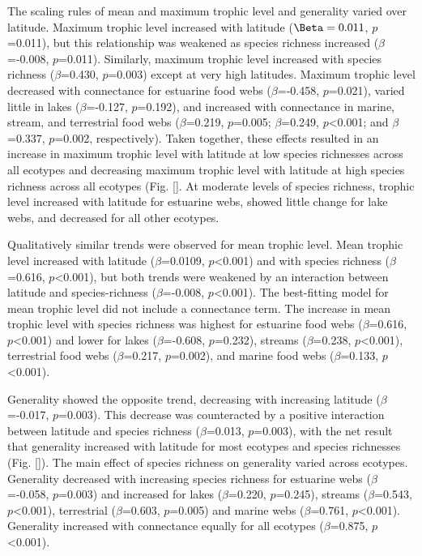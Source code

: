 The scaling rules of mean and maximum trophic level and generality varied over latitude. 
Maximum trophic level increased with 
latitude ($\Beta=0.011$, $p$=0.011), but this relationship was weakened as species richness increased ($\beta$=-0.008, $
p$=0.011). Similarly, maximum trophic level increased with species richness ($\beta$=0.430, $p$=0.003) except at very 
high latitudes. Maximum trophic level decreased with connectance for estuarine food webs ($\beta$=-0.458, $p$=0.021), 
varied little in lakes ($\beta$=-0.127, $p$=0.192), and increased with connectance in marine, stream, and terrestrial 
food webs ($\beta$=0.219, $p$=0.005; $\beta$=0.249, $p$<0.001; and $\beta$=0.337, $p$=0.002, respectively). Taken 
together, these effects resulted in an increase in maximum trophic level with latitude at low species richnesses across 
all ecotypes and decreasing maximum trophic level with latitude at high species richness across all ecotypes 
(Fig. \ref{}. At moderate levels of species richness, trophic level increased with latitude for estuarine webs, showed 
little change for lake webs, and decreased for all other ecotypes. 


Qualitatively similar trends were observed for mean trophic level. Mean trophic level increased with latitude 
($\beta$=0.0109, $p$<0.001) and with species richness ($\beta$=0.616, $p$<0.001), but both trends were weakened by an 
interaction between latitude and species-richness ($\beta$=-0.008, $p$<0.001). The best-fitting model for mean trophic 
level did not include a connectance term. The increase in mean trophic level with species richness was highest for 
estuarine food webs ($\beta$=0.616, $p$<0.001) and lower for lakes ($\beta$=-0.608, $p$=0.232), streams 
($\beta$=0.238, $p$<0.001), terrestrial food webs ($\beta$=0.217, $p$=0.002), and marine food webs 
($\beta$=0.133, $p$<0.001). 


Generality showed the opposite trend, decreasing with increasing latitude ($\beta$=-0.017, $p$=0.003). This decrease 
was counteracted by a positive interaction between latitude and species richness ($\beta$=0.013, $p$=0.003), with the net result that generality increased with latitude for most ecotypes and species richnesses (Fig. \ref{}).
The main effect of species richness on generality varied across ecotypes. Generality decreased with increasing species 
richness for estuarine webs ($\beta$=-0.058, $p$=0.003) and increased for lakes ($\beta$=0.220, $p$=0.245), 
streams ($\beta$=0.543, $p$<0.001), terrestrial ($\beta$=0.603, $p$=0.005) and marine webs ($\beta$=0.761, $p$<0.001). 
Generality increased with connectance equally for all ecotypes ($\beta$=0.875, $p$<0.001).


